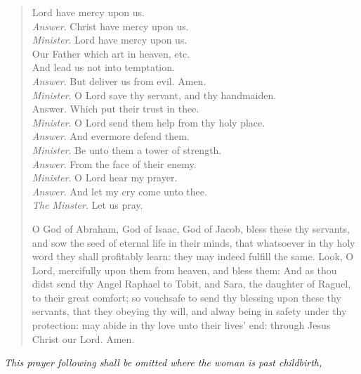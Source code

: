 \documentclass[
]{book}
\begin{document}
\begin{quote}
Lord have mercy upon us.\\
\emph{Answer}. Christ have mercy upon us.\\
\emph{Minister}. Lord have mercy upon us.\\
Our Father which art in heaven, etc.\\
And lead us not into temptation.\\
\emph{Answer}. But deliver us from evil. Amen.\\
\emph{Minister}. O Lord save thy servant, and thy handmaiden.\\
Answer. Which put their trust in thee.\\
\emph{Minister}. O Lord send them help from thy holy place.\\
\emph{Answer}. And evermore defend them.\\
\emph{Minister}. Be unto them a tower of strength.\\
\emph{Answer}. From the face of their enemy.\\
\emph{Minister}. O Lord hear my prayer.\\
\emph{Answer}. And let my cry come unto thee.\\
\emph{The Minster}. Let us pray.

O God of Abraham, God of Isaac, God of Jacob, bless these thy servants, and sow the seed of eternal life in their minds, that whatsoever in thy holy word they shall profitably learn: they may indeed fulfill the same. Look, O Lord, mercifully upon them from heaven, and bless them: And as thou didst send thy Angel Raphael to Tobit, and Sara, the daughter of Raguel, to their great comfort; so vouchsafe to send thy blessing upon these thy servants, that they obeying thy will, and alway being in safety under thy protection: may abide in thy love unto their lives' end: through Jesus Christ our Lord. Amen.
\end{quote}

\begin{center}
\emph{This prayer following shall be omitted where the woman is past childbirth,}

\end{center}
\end{document}
